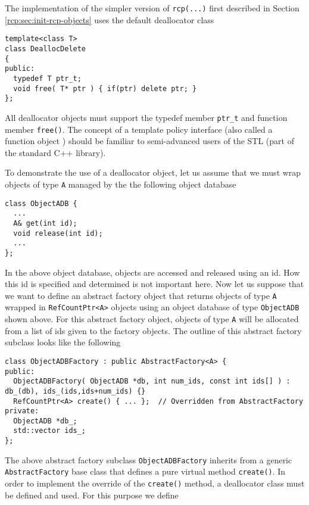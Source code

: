 The implementation of the simpler version of {}\texttt{rcp(...)} first
described in Section {}\ref{rcp:sec:init-rcp-objects} uses the default
deallocator class

{\scriptsize\begin{verbatim}
template<class T>
class DeallocDelete
{
public:
  typedef T ptr_t;
  void free( T* ptr ) { if(ptr) delete ptr; }
};
\end{verbatim}}

All deallocator objects must support the typedef member
{}\texttt{ptr\_t} and function member {}\texttt{free()}.  The concept
of a template policy interface (also called a function object
\cite[Section 18.4]{ref:stroustrup_2000}) should be familiar to
semi-advanced users of the STL (part of the standard C++ library).

To demonstrate the use of a deallocator object, let us assume that we
must wrap objects of type {}\texttt{A} managed by the the following
object database

{\scriptsize\begin{verbatim}
class ObjectADB {
  ...
  A& get(int id);
  void release(int id);
  ...
};
\end{verbatim}}

In the above object database, objects are accessed and released using
an id.  How this id is specified and determined is not important here.
Now let us suppose that we want to define an abstract factory object
that returns objects of type {}\texttt{A} wrapped in
{}\texttt{RefCountPtr<A>} objects using an object database of type
{}\texttt{ObjectADB} shown above.  For this abstract factory object,
objects of type {}\texttt{A} will be allocated from a list of ids
given to the factory objects.  The outline of this abstract factory
subclass looks like the following

{\scriptsize\begin{verbatim}
class ObjectADBFactory : public AbstractFactory<A> {
public:
  ObjectADBFactory( ObjectADB *db, int num_ids, const int ids[] ) : db_(db), ids_(ids,ids+num_ids) {}
  RefCountPtr<A> create() { ... };  // Overridden from AbstractFactory
private:
  ObjectADB *db_;
  std::vector ids_;
};
\end{verbatim}}

The above abstract factory subclass {}\texttt{ObjectADBFactory}
inherits from a generic {}\texttt{AbstractFactory} base class that
defines a pure virtual method {}\texttt{create()}.  In order to
implement the override of the {}\texttt{create()} method, a
deallocator class must be defined and used.  For this purpose we
define

